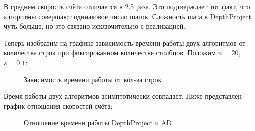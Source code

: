 \documentclass[a4paper, 12pt, oneside]{scrartcl}
\begin{document}
В среднем скорость счёта отличается в 2.5 раза. Это подтверждает тот факт, что алгоритмы совершают одинаковое число шагов. Сложность шага в DepthProject чуть больше, но это связано исключительно с реализацией.

\newpage

Теперь изобразим на графике зависимость времени работы двух алгоритмов от количества строк при фиксированном количестве столбцов. Положим $n = 20$, $s = 0.1$:

\begin{figure}[H]
\caption{Зависимость времени работы от кол-ва строк}
\label{fig:image}
\end{figure}

Время работы двух алгоритмов асимптотически совпадает. Ниже представлен график отношения скоростей счёта:

\begin{figure}[H]
\caption{Отношение времени работы DepthProject и AD}
\label{fig:image}
\end{figure}
\end{document}
